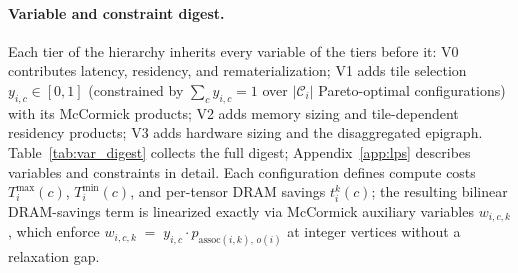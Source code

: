 



\paragraph{Variable and constraint digest.}
Each tier of the hierarchy inherits every variable of the tiers before it: V0 contributes latency, residency, and rematerialization; V1 adds tile selection $y_{i,c} \in [0,1]$ (constrained by $\sum_c y_{i,c} = 1$ over $|\mathcal{C}_i|$ Pareto-optimal configurations) with its McCormick products; V2 adds memory sizing and tile-dependent residency products; V3 adds hardware sizing and the disaggregated epigraph. Table~\ref{tab:var_digest} collects the full digest; Appendix~\ref{app:lps} describes variables and constraints in detail.
Each configuration defines compute costs $T_i^{\max}(c)$,
$T_i^{\min}(c)$, and per-tensor DRAM savings $t_i^k(c)$; the resulting bilinear DRAM-savings term is linearized exactly via
McCormick auxiliary variables $w_{i,c,k}$, which enforce $w_{i,c,k} \;=\; y_{i,c} \cdot p_{\mathrm{assoc}(i,k),\,o(i)}$ at integer vertices without a relaxation gap.

